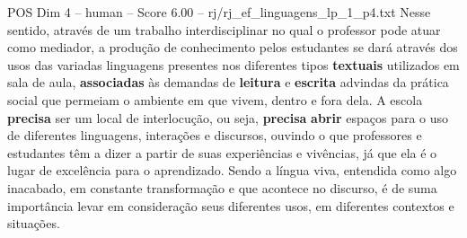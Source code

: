 \begin{textsample}{POS Dim 4 – human – Score 6.00 – rj/rj\_ef\_linguagens\_lp\_1\_p4.txt}  \label{ex:f4_pos_004}
Nesse sentido, através de um trabalho interdisciplinar no qual o professor pode atuar como mediador, a produção de conhecimento pelos estudantes se dará através dos usos das variadas linguagens presentes nos diferentes tipos \textbf{textuais} utilizados em sala de aula, \textbf{associadas} às demandas de \textbf{leitura} e \textbf{escrita} advindas da prática social que permeiam o ambiente em que vivem, dentro e fora dela.
A escola \textbf{precisa} ser um local de interlocução, ou seja, \textbf{precisa} \textbf{abrir} espaços para o uso de diferentes linguagens, interações e discursos, ouvindo o que professores e estudantes têm a dizer a partir de suas experiências e vivências, já que ela é o lugar de excelência para o aprendizado.
Sendo a língua viva, entendida como algo inacabado, em constante transformação e que acontece no discurso, é de suma importância levar em consideração seus diferentes usos, em diferentes contextos e situações.

\end{textsample}
